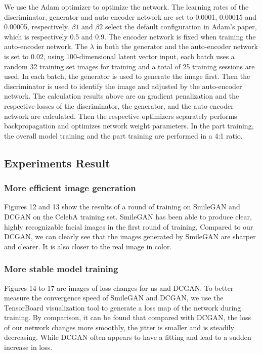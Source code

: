 We use the Adam optimizer to optimize the network.
The learning rates of the discriminator, generator and auto-encoder network are set to 0.0001, 0.00015 and 0.00005, respectively.
$\beta1$ and $\beta2$ select the default configuration in Adam's paper, which is respectively 0.5 and 0.9.
The encoder network is fixed when training the auto-encoder network.
The $\lambda$ in both the generator and the auto-encoder network is set to 0.02, using 100-dimensional latent vector input, each batch uses a random 32 training set images for training and a total of 25 training sessions are used.
In each batch, the generator is used to generate the image first.
Then the discriminator is used to identify the image and adjusted by the auto-encoder network.
The calculation results above are on gradient penalization and the respective losses of the discriminator, the generator, and the auto-encoder network are calculated.
Then the respective optimizers separately performs backpropagation and optimizes network weight parameters.
In the part training, the overall model training and the part training are performed in a 4:1 ratio.

\subsection{Experiments Result}
\subsubsection*{More efficient image generation} 
Figures 12 and 13 show the results of a round of training on SmileGAN and DCGAN on the CelebA training set.
SmileGAN has been able to produce clear, highly recognizable facial images in the first round of training.
Compared to our DCGAN, we can clearly see that the images generated by SmileGAN are sharper and clearer.
It is also closer to the real image in color.

\subsubsection*{More stable model training}
Figures 14 to 17 are images of loss changes for us and DCGAN.
To better measure the convergence speed of SmileGAN and DCGAN, we use the TensorBoard visualization tool to generate a loss map of the network during training.
By comparison, it can be found that compared with DCGAN, the loss of our network changes more smoothly, the jitter is smaller and is steadily decreasing.
While DCGAN often appears to have a fitting and lead to a sudden increase in loss.

